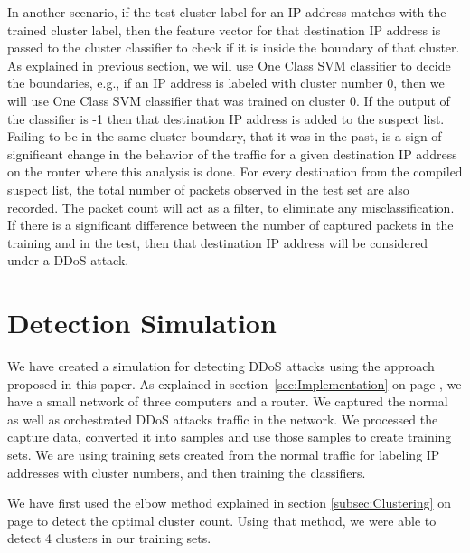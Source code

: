 \documentclass[12pt,oneside,a4paper]{article}
\begin{document}
In another scenario, if the test cluster label for an IP address matches with the trained cluster label, then the feature vector for that destination IP address is passed to the cluster classifier to check if it is inside the boundary of that cluster. As explained in previous section, we will use One Class SVM classifier to decide the boundaries, e.g., if an IP address is labeled with cluster number 0, then we will use One Class SVM classifier that was trained on cluster 0. If the output of the classifier is -1 then that destination IP address is added to the suspect list. Failing to be in the same cluster boundary, that it was in the past, is a sign of significant change in the behavior of the traffic for a given destination IP address on the router where this analysis is done. For every destination from the compiled suspect list, the total number of packets observed in the test set are also recorded. The packet count will act as a filter, to eliminate any misclassification. If there is a significant difference between the number of captured packets in the training and in the test, then that destination IP address will be considered under a DDoS attack.
\pagebreak
\section{Detection Simulation}

We have created a simulation for detecting DDoS attacks using the approach proposed in this paper. As explained in section~\ref{sec:Implementation} on page \pageref{sec:Implementation}, we have a small network of three computers and a router. We captured the normal as well as orchestrated DDoS attacks traffic in the network. We processed the capture data, converted it into samples and use those samples to create training sets. We are using training sets created from the normal traffic for labeling IP addresses with cluster numbers, and then training the classifiers.

We have first used the elbow method explained in section \ref{subsec:Clustering} on page \pageref{subsec:Clustering} to detect the optimal cluster count. Using that method, we were able to detect 4 clusters in our training sets.
\end{document}
